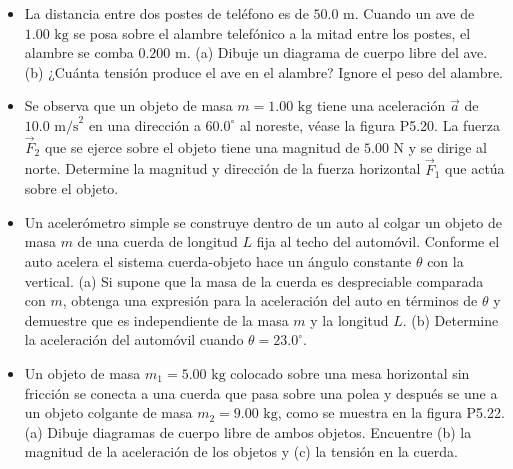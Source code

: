 \documentclass[11pt,a4paper]{article}
\begin{document}
\newpage

\begin{itemize}
    \item[\textbf{19.}] La distancia entre dos postes de teléfono es de $50.0 \text{ m}$. Cuando un ave de $1.00 \text{ kg}$ se posa sobre el alambre telefónico a la mitad entre los postes, el alambre se comba $0.200 \text{ m}$. (a) Dibuje un diagrama de cuerpo libre del ave. (b) ¿Cuánta tensión produce el ave en el alambre? Ignore el peso del alambre.
    \vspace*{6cm}

    \item[\textbf{20.}] Se observa que un objeto de masa $m = 1.00 \text{ kg}$ tiene una aceleración $\vec{a}$ de $10.0 \text{ m/s}^2$ en una dirección a $60.0^\circ$ al noreste, véase la figura P5.20. La fuerza $\vec{F}_2$ que se ejerce sobre el objeto tiene una magnitud de $5.00 \text{ N}$ y se dirige al norte. Determine la magnitud y dirección de la fuerza horizontal $\vec{F}_1$ que actúa sobre el objeto.
    \vspace*{6cm}

    \item[\textbf{21.}] Un acelerómetro simple se construye dentro de un auto al colgar un objeto de masa $m$ de una cuerda de longitud $L$ fija al techo del automóvil. Conforme el auto acelera el sistema cuerda-objeto hace un ángulo constante $\theta$ con la vertical. (a) Si supone que la masa de la cuerda es despreciable comparada con $m$, obtenga una expresión para la aceleración del auto en términos de $\theta$ y demuestre que es independiente de la masa $m$ y la longitud $L$. (b) Determine la aceleración del automóvil cuando $\theta = 23.0^\circ$.
    \vspace*{6cm}

    \item[\textbf{22.}] Un objeto de masa $m_1 = 5.00 \text{ kg}$ colocado sobre una mesa horizontal sin fricción se conecta a una cuerda que pasa sobre una polea y después se une a un objeto colgante de masa $m_2 = 9.00 \text{ kg}$, como se muestra en la figura P5.22. (a) Dibuje diagramas de cuerpo libre de ambos objetos. Encuentre (b) la magnitud de la aceleración de los objetos y (c) la tensión en la cuerda.
    \vspace*{7cm}
\end{itemize}

\newpage
\end{document}
